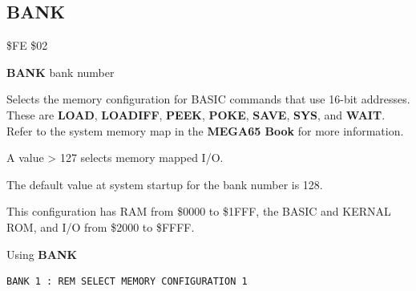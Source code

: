 
\newpage
\subsection{BANK}
\label{BASIC 65 Commands!BANK}
\begin{description}[leftmargin=2cm,style=nextline]
\item [Token:]    \$FE \$02

\item [Format:]   {\bf BANK} bank number

\item [Usage:]    Selects the memory configuration for BASIC commands that use 16-bit addresses. These are {\bf LOAD}, {\bf LOADIFF}, {\bf PEEK}, {\bf POKE}, {\bf SAVE}, {\bf SYS}, and {\bf WAIT}. Refer to the system memory map in \ifdefined\printmanual
   the {\bf MEGA65 Book}
\else
\fi for more information.

\item [Remarks:]  A value > 127 selects memory mapped I/O.

                  The default value at system startup for the bank number is 128.

                  This configuration has RAM from \$0000 to \$1FFF, the BASIC and KERNAL ROM, and I/O from \$2000 to \$FFFF.

\item [Example:]  Using {\bf BANK}

\begin{tcolorbox}[colback=black,coltext=white]
\verbatimfont{\codefont}
\begin{verbatim}
BANK 1 : REM SELECT MEMORY CONFIGURATION 1
\end{verbatim}
\end{tcolorbox}
\end{description}


\newpage
